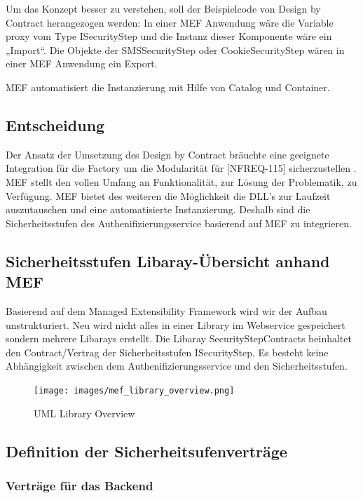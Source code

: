 Um das Konzept besser zu verstehen, soll der Beispielcode von Design by
Contract herangezogen werden: In einer MEF Anwendung wäre die Variable
proxy vom Type ISecurityStep und die Instanz dieser Komponente wäre ein
„Import``. Die Objekte der SMSSecurityStep oder CookieSecurityStep wären
in einer MEF Anwendung ein Export.

MEF automatisiert die Instanzierung mit Hilfe von Catalog und Container.

\subsection{Entscheidung}\label{entscheidung-1}

Der Ansatz der Umsetzung des Design by Contract bräuchte eine geeignete
Integration für die Factory um die Modularität für {[}NFREQ-115{]}
sicherzustellen . MEF stellt den vollen Umfang an Funktionalität, zur
Lösung der Problematik, zu Verfügung. MEF bietet des weiteren die
Möglichkeit die DLL's zur Laufzeit auszutauschen und eine automatisierte
Instanzierung. Deshalb sind die Sicherheitsstufen des
Authenifizierungsservice basierend auf MEF zu integrieren.

\newpage

\subsection{Sicherheitsstufen Libaray-Übersicht anhand
MEF}\label{sicherheitsstufen-libaray-uxfcbersicht-anhand-mef}

Basierend auf dem Managed Extensibility Framework wird wir der Aufbau
unstrukturiert. Neu wird nicht alles in einer Library im Webservice
gespeichert sondern mehrere Libarays erstellt. Die Libaray
SecurityStepContracts beinhaltet den Contract/Vertrag der
Sicherheitsstufen ISecurityStep. Es besteht keine Abhängigkeit zwischen
dem Authenifizierungsservice und den Sicherheitsstufen.

\begin{figure}[htbp]
\centering
\texttt{[image: images/mef\_library\_overview.png]}
\caption{UML Library Overview}
\end{figure}

\subsection{Definition der
Sicherheitsufenverträge}\label{definition-der-sicherheitsufenvertruxe4ge}

\subsubsection{Verträge für das
Backend}\label{vertruxe4ge-fuxfcr-das-backend}

